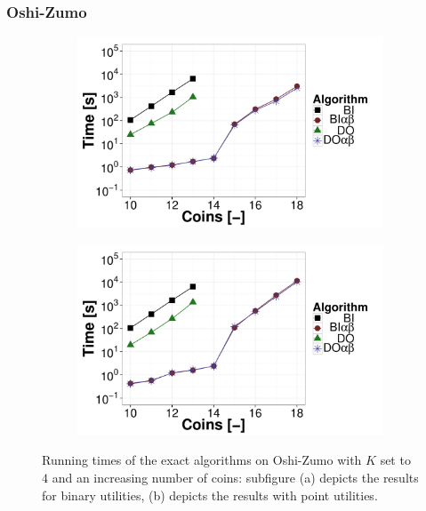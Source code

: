 \subsubsection{Oshi-Zumo}
\begin{figure}[t!]
\centering
	\begin{subfigure}{0.49\textwidth}
		\includegraphics[width=1\textwidth]{figures/OZ-K4.pdf}\caption{}\label{fig:off:res:oz4}
	\end{subfigure}
	\begin{subfigure}{0.49\textwidth}
		\includegraphics[width=1\textwidth]{figures/OZ-K4-BF.pdf}\caption{}\label{fig:off:res:oz4-bf}
	\end{subfigure}
\caption{Running times of the exact algorithms on Oshi-Zumo with $K$ set to $4$ and an increasing number of coins: subfigure (a) depicts the results for binary utilities, (b) depicts the results with point utilities.} \label{fig:off:res:oz}
\end{figure}

